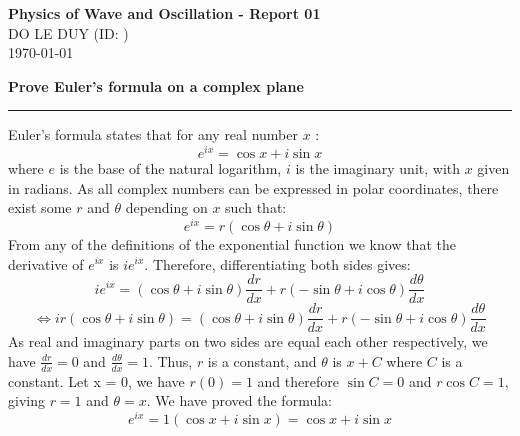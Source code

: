 \documentclass[11pt]{exam}
\newcommand{\myclass}{Physics of Wave and Oscillation}
\newcommand{\myname}{DO LE DUY}
\newcommand{\myhwtype}{Report 01}
\begin{document}
\thispagestyle{plain}
\begin{center}
  {\Large \textbf{\myclass{} - \myhwtype{} }}\\
  \vspace{0.6em} {\myname{} (\small{ID: \mystudentid{}})} \\
  \today
\end{center}


\textbf{Prove Euler's formula on a complex plane}
\vspace{0.3em} \hrule \vspace{.1in}

Euler's formula states that for any real number \(x\) :
\[
e^{i x}=\cos x+i \sin x
\]
where \(e\) is the base of the natural logarithm, \(i\) is the imaginary unit, with \(x\) given in radians. \newline
As all complex numbers can be expressed in polar coordinates, there exist some \(r\) and \(\theta\) depending on \(x\) such that:
\[
e^{i x}=r(\cos \theta+i \sin \theta)
\]
From any of the definitions of the exponential function we know that the derivative of \(e^{i x}\) is \(i e^{i x}\). Therefore,
differentiating both sides gives:
\[
i e^{i x}=(\cos \theta+i \sin \theta) \frac{d r}{d x}+r(-\sin \theta+i \cos \theta) \frac{d \theta}{d x}
\]
\[
\iff i r(\cos \theta+i \sin \theta)=(\cos \theta+i \sin \theta) \frac{d r}{d x}+r(-\sin \theta+i \cos \theta) \frac{d \theta}{d x}
\]
As real and imaginary parts on two sides are equal each other respectively, we have \(\frac{d r}{d x}=0\) and \(\frac{d \theta}{d x}=1 .\) Thus, \(r\) is a constant, and \(\theta\) is \(x+C\) where \(C\) is a constant. Let x = 0, we have \(r(0)=1\) and therefore \(\sin C = 0\) and \(r\cos C = 1\), giving \(r=1\) and \(\theta=x .\) We have proved the formula:
\[
e^{i x}=1(\cos x+i \sin x)=\cos x+i \sin x
\]
\end{document}

